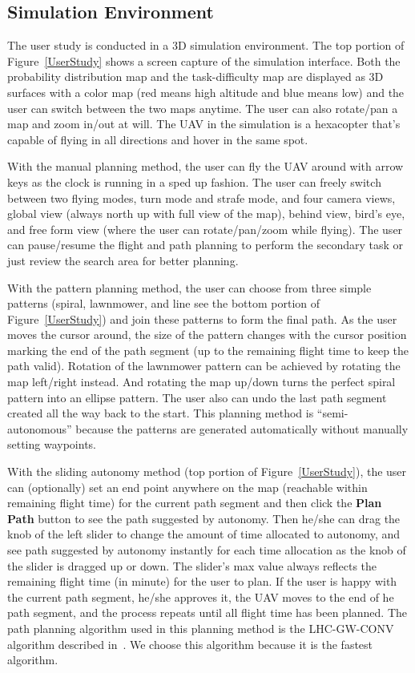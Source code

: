 \documentclass[journal]{IEEEtran}
\begin{document}
\subsection{Simulation Environment}

The user study is conducted in a 3D simulation environment. The top portion of Figure~\ref{UserStudy} shows a screen capture of the simulation interface. Both the probability distribution map and the task-difficulty map are displayed as 3D surfaces with a color map (red means high altitude and blue means low) and the user can switch between the two maps anytime. The user can also rotate/pan a map and zoom in/out at will. The UAV in the simulation is a hexacopter that's capable of flying in all directions and hover in the same spot.

With the manual planning method, the user can fly the UAV around with arrow keys as the clock is running in a sped up fashion. The user can freely switch between two flying modes, turn mode and strafe mode, and four camera views, global view (always north up with full view of the map), behind view, bird's eye, and free form view (where the user can rotate/pan/zoom while flying). The user can pause/resume the flight and path planning to perform the secondary task or just review the search area for better planning.

With the pattern planning method, the user can choose from three simple patterns (spiral, lawnmower, and line see the bottom portion of Figure~\ref{UserStudy}) and join these patterns to form the final path. As the user moves the cursor around, the size of the pattern changes with the cursor position marking the end of the path segment (up to the remaining flight time to keep the path valid). Rotation of the lawnmower pattern can be achieved by rotating the map left/right instead. And rotating the map up/down turns the perfect spiral pattern into an ellipse pattern. The user also can undo the last path segment created all the way back to the start. This planning method is ``semi-autonomous'' because the patterns are generated automatically without manually setting waypoints.

With the sliding autonomy method (top portion of Figure~\ref{UserStudy}), the user can (optionally) set an end point anywhere on the map (reachable within remaining flight time) for the current path segment and then click the \textbf{Plan Path} button to see the path suggested by autonomy. Then he/she can drag the knob of the left slider to change the amount of time allocated to autonomy, and see path suggested by autonomy instantly for each time allocation as the knob of the slider is dragged up or down. The slider's max value always reflects the remaining flight time (in minute) for the user to plan. If the user is happy with the current path segment, he/she approves it, the UAV moves to the end of he path segment, and the process repeats until all flight time has been planned. The path planning algorithm used in this planning method is the LHC-GW-CONV algorithm described in~\cite{Lin2009UAV, Lin2014Hierarchical}. We choose this algorithm because it is the fastest algorithm.
\end{document}
